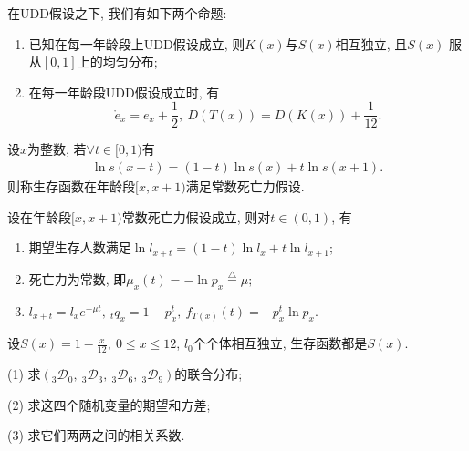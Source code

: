 \documentclass[lang=cn,10pt]{elegantbook}
\begin{document}
\begin{proposition}
    在UDD假设之下, 我们有如下两个命题:
    \begin{enumerate}
        \item 已知在每一年龄段上UDD假设成立, 则$K(x)$与$S(x)$相互独立, 且$S(x)$ 服从$[0,1]$上的均匀分布;
        \item 在每一年龄段UDD假设成立时, 有
              $$\mathring{e}_{x}=e_{x}+\frac{1}{2},\   D(T(x))=D(K(x))+\frac{1}{12}.$$
    \end{enumerate}
\end{proposition}

\begin{definition}[常数死亡力假设]
    设$x$为整数, 若$\forall t\in [0,1)$有
    \begin{align}\label{tulb}
        \ln s(x+t)=(1-t)\ln s(x)+t\ln s(x+1).
    \end{align}
    则称生存函数在年龄段$[x,x+1)$满足常数死亡力假设.
\end{definition}

\begin{corollary}
    设在年龄段$[x,x+1)$常数死亡力假设成立, 则对$t\in (0,1)$, 有
    \begin{enumerate}
        \item 期望生存人数满足$\ln l_{x+t}=(1-t)\ln l_{x}+t\ln l_{x+1};$
        \item 死亡力为常数, 即$\mu _{x}(t)=-\ln p_{x}\stackrel{\triangle}{=}\mu;$
        \item $l_{x+t}=l_{x}e^{-\mu t},\ _{t}q_{x}=1-p^{t}_{x},\ f_{T(x)}(t)=-p_{x}^{t}\ln p_{x}.$
    \end{enumerate}
\end{corollary}

\begin{example}
    设$S(x)=1-\frac{x}{12},\ 0\leq x\leq 12$, $l_{0}$个个体相互独立, 生存函数都是$S(x)$.

    (1) 求$(_{3}\mathscr D _{0},\ _{3}\mathscr D_{3},\ _{3}\mathscr D _{6},\ _{3}\mathscr D _{9})$的联合分布;

    (2) 求这四个随机变量的期望和方差;

    (3) 求它们两两之间的相关系数.
\end{example}
\end{document}
